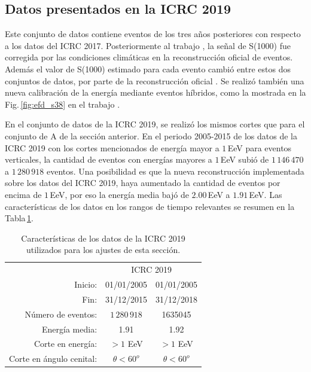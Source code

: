 \subsection{Datos presentados en la ICRC 2019}\label{conjuntoB}

Este conjunto de datos contiene eventos de los tres años posteriores con respecto  a los datos del ICRC 2017. Posteriormente al trabajo \cite{aab2017impact}, la señal de S(1000) fue corregida por las condiciones climáticas en la reconstrucción oficial de eventos. Además el valor de S(1000) estimado para cada evento cambió entre estos dos conjuntos de datos, por parte de la reconstrucción oficial \cite{isabel}. Se realizó también una nueva calibración de la energía mediante eventos híbridos, como la mostrada en la Fig.\,\ref{fig:efd_s38} en el trabajo  \cite{tobepublished}. 

En el conjunto de datos de la ICRC 2019, se realizó los mismos cortes que para el conjunto de A de la sección anterior. En el periodo 2005-2015 de los datos de la ICRC 2019 con los cortes mencionados de energía mayor a $1\,$EeV para eventos verticales, la cantidad de eventos con energías mayores a $1\,$EeV subió de $1\,146\,470$ a  $1\,280\,918$ eventos. %
Una posibilidad es que la nueva reconstrucción implementada sobre los datos del ICRC 2019, haya aumentado la cantidad de eventos por encima de $1\,$EeV, por eso la energía media bajó de $2.00\,$EeV a $1.91\,$EeV.  Las características de los datos en los rangos de tiempo relevantes se resumen en la Tabla\,\ref{tabla:caracteristicas_ICRC_2019}. 

   \begin{table}[H]
       \centering
       \begin{tabular}{r|c|c|}
    \cline{2-3}
                              & \multicolumn{2}{c|}{ICRC 2019} \\ \cline{2-3}
         Inicio:              & 01/01/2005      & 01/01/2005\\
         Fin:                 & 31/12/2015      & 31/12/2018\\  
         Número de eventos:   &  $1\,280\,918$     			    &  1635045     		        \\ 
         Energía media:       &  1.91				        &	1.92				        \\ 
         Corte en energía:    &  $>1$ EeV       		 	    &  $>1$  EeV       		 \\ 
         Corte en ángulo cenital:	&  $\theta<60^o$ 				    & $\theta < 60^o$\\ \cline{2-3}
       \end{tabular}
       \caption{Características de los datos de la ICRC 2019 utilizados para los ajustes de esta sección.} \label{tabla:caracteristicas_ICRC_2019}
   \end{table}

